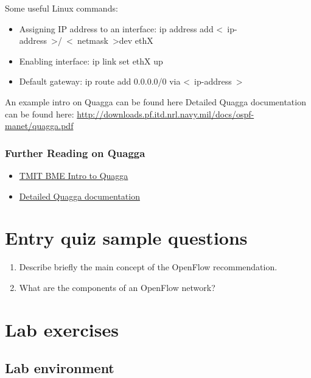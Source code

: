 \documentclass[a4paper]{article}
\begin{document}
Some useful Linux commands:

\begin{itemize}
\item Assigning IP address to an interface: ip address add \textless~ip-address~\textgreater/~\textless~netmask~\textgreater dev ethX
\item Enabling interface: ip link set ethX up
\item Default gateway: ip route add 0.0.0.0/0 via \textless~ip-address~\textgreater
\end{itemize}

An example intro on Quagga can be found here
Detailed Quagga documentation can be found here: \url{http://downloads.pf.itd.nrl.navy.mil/docs/ospf-manet/quagga.pdf}

\subsubsection{Further Reading on Quagga}

\begin{itemize}
    \item \href{http://unixlinux.tmit.bme.hu/Quagga}{TMIT BME Intro to Quagga}
    \item \href{http://downloads.pf.itd.nrl.navy.mil/docs/ospf-manet/quagga.pdf}{Detailed Quagga documentation}
\end{itemize}


\appendix

\section{Entry quiz sample questions}

\begin{enumerate}
    \item Describe briefly the main concept of the OpenFlow recommendation.
    \item What are the components of an OpenFlow network?
\end{enumerate}

\section{Lab exercises}

\subsection{Lab environment}
\end{document}
